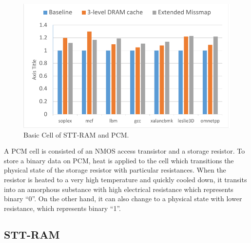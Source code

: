 \begin{figure}[t]
\centering
 \includegraphics[scale=0.7]{figs/vector}    

\caption{Basic Cell of STT-RAM and PCM.}
\label{fig:sttpcm cell}
\end{figure}


A PCM cell is consisted of an NMOS access transistor and a storage resistor. To store a binary data on PCM, heat is applied to the cell which transitions the physical state of the storage resistor with particular resistances. When the resistor is heated to a very high temperature and quickly cooled down, it transits into an amorphous substance with high electrical resistance which represents binary “0”. On the other hand, it can also change to a physical state with lower resistance, which represents binary “1”.    





\subsection{STT-RAM}
\label{sec:background:stt-ram}



